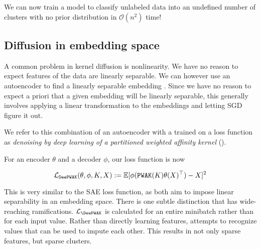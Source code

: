 We can now train a model to classify unlabeled data into an undefined number of clusters with no prior distribution in $\mathcal{O}(n^2)$ time!


\subsection{Diffusion in embedding space}

A common problem in kernel diffusion is nonlinearity.
We have no reason to expect features of the data are linearly separable.
We can however use an autoencoder to find a linearly separable embedding \cite{xie2016unsupervised}.
Since we have no reason to expect a priori that a given embedding will be linearly separable,
this generally involves applying a linear transformation to the embeddings and letting SGD figure it out.

We refer to this combination of an autoencoder with a \Partitioner trained on a \PWAK loss function as \textit{denoising by deep learning of a partitioned weighted affinity kernel} (\DeePWAK).

For an encoder $\theta$ and a decoder $\phi$, our loss function is now

\begin{equation}
  \mathcal{L}_{\mathop{\mathtt{DeePWAK}}\limits}(\theta,\phi,K,X) := \mathbb{E}[\phi(\mathop{\mathtt{PWAK}}\limits(K)\theta(X)^\top) - X]^2
\end{equation}

This is very similar to the SAE loss function, as both aim to impose linear separability in an embedding space.
There is one subtle distinction that has wide-reaching ramifications.
$\mathcal{L}_{\DeePWAK}$ is calculated for an entire minibatch rather than for each input value.
Rather than directly learning features, \DeePWAK attempts to recognize values that can be used to impute each other.
This results in not only sparse features, but sparse clusters.
